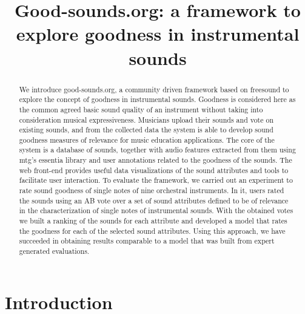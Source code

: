 \documentclass{article}
\title{Good-sounds.org: a framework to explore goodness in instrumental sounds}
\begin{document}
%
\maketitle
%
\begin{abstract}
We introduce good-sounds.org, a community driven framework based on freesound to explore the concept of goodness in instrumental sounds. Goodness is considered here as the common agreed basic sound quality of an instrument without taking into consideration musical expressiveness. Musicians upload their sounds and vote on existing sounds, and from the collected data the system is able to develop sound goodness measures of relevance for music education applications. The core of the system is a database of sounds, together with audio features extracted from them using mtg's essentia library and user annotations related to the goodness of the sounds. The web front-end provides useful data visualizations of the sound attributes and tools to facilitate user interaction. To evaluate the framework, we carried out an experiment to rate sound goodness of single notes of nine orchestral instruments. In it, users rated the sounds using an AB vote over a set of sound attributes defined to be of relevance in the characterization of single notes of instrumental sounds. With the obtained votes we built a ranking of the sounds for each attribute and developed a model that rates the goodness for each of the selected sound attributes. Using this approach, we have succeeded in obtaining results comparable to a model that was built from expert generated evaluations.
\end{abstract}
%
\section{Introduction}\label{sec:introduction}
\end{document}
